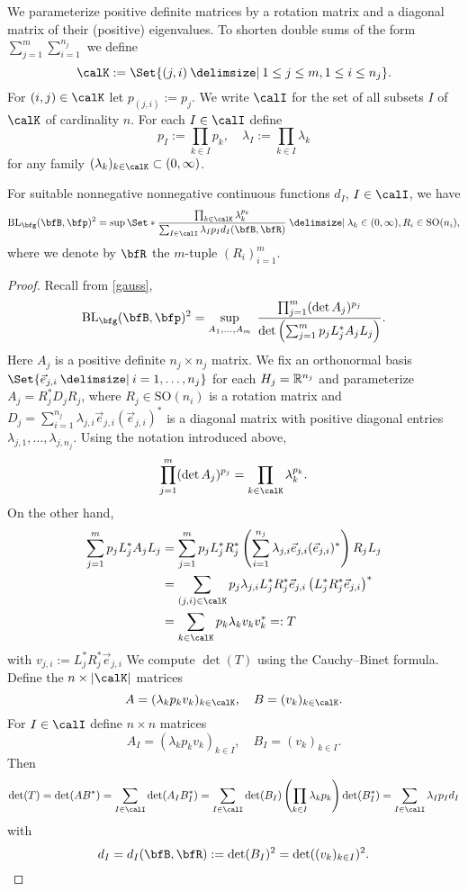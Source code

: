\documentclass[biblatex]{pzorin-note}
\begin{document}
We parameterize positive definite matrices by a rotation matrix and a diagonal matrix of their (positive) eigenvalues.
To shorten double sums of the form $\sum_{j=1}^m \sum_{i = 1}^{n_j}$ we define
\[
\calK := \Set{ (j,i) \given 1 \leq j \leq m, 1 \leq i \leq n_{j} }.
\]
For $(i,j) \in \calK$ let $p_{(j,i)} := p_{j}$.
We write $\calI$ for the set of all subsets $I$ of $\calK$ of cardinality $n$.
For each $I\in\calI$ define
\[
p_I := \prod_{k\in I} p_k,
\quad
\lambda_I := \prod_{k\in I} \lambda_k
\]
for any family $(\lambda_{k})_{k\in\calK} \subset (0,\infty)$.
\begin{lemma}
\label{thm:BL-lambda-R}
For suitable nonnegative nonnegative continuous functions $d_{I}$, $I\in\calI$, we have
\begin{equation}
\label{eq:BL-lambda-R}
\BL_{\bfg}(\bfB,\bfp)^{2} = \sup \Set*{
\frac{\prod_{k\in\calK} \lambda_k^{p_k} }{ \sum_{I\in \calI}  \lambda_I p_I d_I(\bfB,\bfR) } \given \lambda_k \in (0,\infty), R_i \in \mathrm{SO}(n_i)
},
\end{equation}
where we denote by $\bfR$ the $m$-tuple $(R_i)_{i=1}^m$.
\end{lemma}
\begin{proof}
Recall from \eqref{gauss},
\[
\BL_{\bfg}(\bfB,\bfp)^{2}
=
\sup_{A_{1},\dotsc,A_{m}} \;\frac{\prod_{j=1}^m(\det A_j)^{p_j}}{\det\left(\sum_{j=1}^m p_jL_{j}^*A_jL_{j}\right)}.
\]
Here $A_j$ is a positive definite $n_j \times n_j$ matrix.
We fix an orthonormal basis $\Set{ \vec{e}_{j,i} \given i = 1, \dots, n_j }$ for each $H_{j} = \mathbb{R}^{n_j}$ and parameterize $A_j = R_j^* D_j R_j$, where $R_j \in \mathrm{SO}(n_i)$ is a rotation matrix and $D_j = \sum_{i=1}^{n_j} \lambda_{j,i} \vec{e}_{j,i} ({\vec{e}_{j,i}})^*$ is a diagonal matrix with positive diagonal entries $\lambda_{j,1}, \dotsc, \lambda_{j,n_j}$.
Using the notation introduced above,
\[
\prod_{j=1}^m (\det A_j)^{p_j}
=
\prod_{k\in\calK} \lambda_k^{p_k}.
\]
On the other hand,
\begin{align*}
\sum_{j=1}^m p_jL_{j}^*A_jL_{j}
& =
\sum_{j=1}^m p_jL_{j}^*R_j^*\left(  \sum_{i=1}^{n_j} \lambda_{j,i} \vec{e}_{j,i}(\vec{e}_{j,i})^* \right)   R_jL_{j}
\\ & =
\sum_{(j,i) \in \calK} p_j \lambda_{j,i} L_{j}^* R_j^* \vec{e}_{j,i} \left(L_{j}^* R_j^* \vec{e}_{j,i} \right)^*
\\ & =
\sum_{k \in \calK} p_k \lambda_k v_k  v_k^*
=: T
\end{align*}
with $v_{j,i} := L_{j}^* R_j^* \vec{e}_{j,i}$
We compute $\det(T)$ using the Cauchy--Binet formula.
Define the $n \times \abs{\calK}$ matrices
\[
A = (\lambda_k  p_k v_k)_{k \in \calK},
\quad
B = (v_{k})_{k \in \calK}.
\]
For $I \in \calI$ define $n \times n$ matrices
\[
A_{I} = (\lambda_k  p_k v_k)_{k \in I},
\quad
B_{I} = (v_{k})_{k \in I}.
\]
Then
\[
\det(T)=\det(AB^{*})
= \sum_{I\in \calI} \det (A_I B_I^{*})
= \sum_{I\in \calI} \det(B_{I}) \left( \prod_{k \in I} \lambda_k  p_k \right) \det (B_I^{*})
= \sum_{I\in \calI}  \lambda_I p_I d_I
\]
with
\[
d_I
=
d_{I}(\bfB,\bfR)
:=
\det (B_I)^{2}
=
\det((v_k)_{k\in I})^2.
\qedhere
\]
\end{proof}
\end{document}
